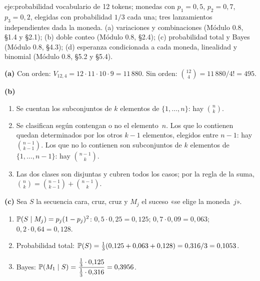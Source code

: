 \begin{solucion}{eje:probabilidad}
\datos vocabulario de 12 tokens; monedas con $p_1=0{,}5$, $p_2=0{,}7$, $p_3=0{,}2$, elegidas con probabilidad $1/3$ cada una; tres lanzamientos independientes dada la moneda.
\planteamiento (a) variaciones y combinaciones (Módulo 0.8, §1.4 y §2.1); (b) doble conteo (Módulo 0.8, §2.4); (c) probabilidad total y Bayes (Módulo 0.8, §4.3); (d) esperanza condicionada a cada moneda, linealidad y binomial (Módulo 0.8, §5.2 y §5.4).
\pasos

\noindent\textbf{(a)} Con orden: $V_{12,4}=12\cdot11\cdot10\cdot9=11\,880$. Sin orden: $\binom{12}{4}=11\,880/4!=495$.

\noindent\textbf{(b)}
\begin{enumerate}[label=\arabic*.]
  \item Se cuentan los subconjuntos de $k$ elementos de $\{1,\dots,n\}$: hay $\binom nk$.
  \item Se clasifican según contengan o no el elemento~$n$. Los que lo contienen quedan determinados por los otros $k-1$ elementos, elegidos entre $n-1$: hay $\binom{n-1}{k-1}$. Los que no lo contienen son subconjuntos de $k$ elementos de $\{1,\dots,n-1\}$: hay $\binom{n-1}{k}$.
  \item Las dos clases son disjuntas y cubren todos los casos; por la regla de la suma, $\binom nk=\binom{n-1}{k-1}+\binom{n-1}{k}$.
\end{enumerate}

\noindent\textbf{(c)} Sea $S$ la secuencia cara, cruz, cruz y $M_j$ el suceso «se elige la moneda~$j$».
\begin{enumerate}[label=\arabic*.]
  \item $\mathbb{P}(S\mid M_j)=p_j(1-p_j)^{2}$: $0{,}5\cdot0{,}25=0{,}125$; $0{,}7\cdot0{,}09=0{,}063$; $0{,}2\cdot0{,}64=0{,}128$.
  \item Probabilidad total: $\mathbb{P}(S)=\frac13(0{,}125+0{,}063+0{,}128)=0{,}316/3=0{,}1053$.
  \item Bayes: $\mathbb{P}(M_1\mid S)=\dfrac{\frac13\cdot0{,}125}{\frac13\cdot0{,}316}=0{,}3956$.
\end{enumerate}


\end{solucion}
